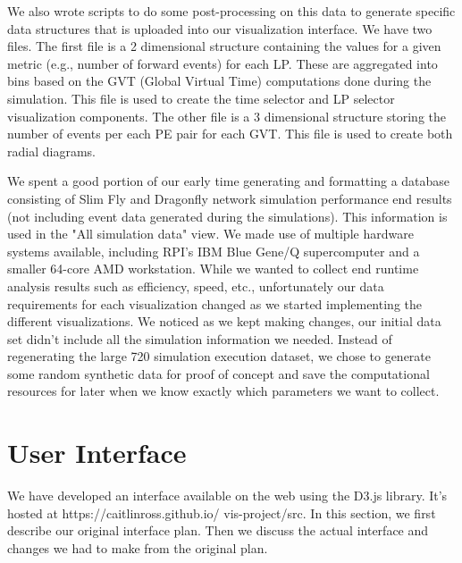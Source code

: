 \documentclass{acm_proc_article-sp}
\begin{document}
We also wrote scripts to do some post-processing on this data to generate specific data structures that is uploaded into our visualization interface.  We have two files. The first file is a 2 dimensional structure containing the values for a given metric (e.g., number of forward events) for each LP. These are aggregated into bins based on the GVT (Global Virtual Time) computations done during the simulation.  This file is used to create the time selector and LP selector visualization components. The other file is a 3 dimensional structure storing the number of events per each PE pair for each GVT. This file is used to create both radial diagrams.



We spent a good portion of our early time generating and formatting a database consisting of Slim Fly and Dragonfly network simulation performance end results (not including event data generated during the simulations). This information is used in the "All simulation data" view. We made use of multiple hardware systems available, including RPI's IBM Blue Gene/Q supercomputer and a smaller 64-core AMD workstation. While we wanted to collect end runtime analysis results such as efficiency, speed, etc., unfortunately our data requirements for each visualization changed as we started implementing the different visualizations. We noticed as we kept making changes, our initial data set didn't include all the simulation information we needed. Instead of regenerating the large 720 simulation execution dataset, we chose to generate some random synthetic data for proof of concept and save the computational resources for later when we know exactly which parameters we want to collect. 


\section{User Interface}
We have developed an interface available on the web using the D3.js library.  It's hosted at https://caitlinross.github.io/ vis-project/src.  In this section, we first describe our original interface plan.  Then we discuss the actual interface and changes we had to make from the original plan.  
\end{document}
